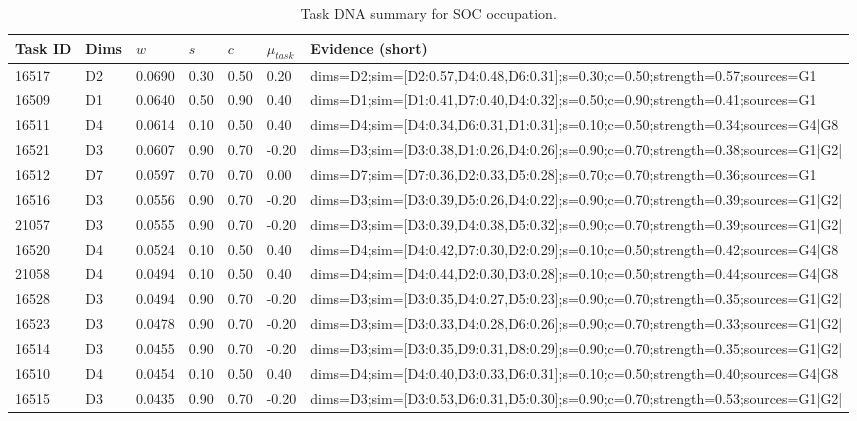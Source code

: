 \begin{table}[htbp]
\centering
\caption{Task DNA summary for SOC occupation.}
\label{tab:appendix_taskdna}
\begin{tabular}{@{}lllllll@{}}
\toprule
Task ID & Dims & $w$ & $s$ & $c$ & $\mu_{task}$ & Evidence (short) \\
\midrule
16517 & D2 & 0.0690 & 0.30 & 0.50 & 0.20 & dims=D2;sim=[D2:0.57,D4:0.48,D6:0.31];s=0.30;c=0.50;strength=0.57;sources=G1 \\
16509 & D1 & 0.0640 & 0.50 & 0.90 & 0.40 & dims=D1;sim=[D1:0.41,D7:0.40,D4:0.32];s=0.50;c=0.90;strength=0.41;sources=G1 \\
16511 & D4 & 0.0614 & 0.10 & 0.50 & 0.40 & dims=D4;sim=[D4:0.34,D6:0.31,D1:0.31];s=0.10;c=0.50;strength=0.34;sources=G4|G8 \\
16521 & D3 & 0.0607 & 0.90 & 0.70 & -0.20 & dims=D3;sim=[D3:0.38,D1:0.26,D4:0.26];s=0.90;c=0.70;strength=0.38;sources=G1|G2| \\
16512 & D7 & 0.0597 & 0.70 & 0.70 & 0.00 & dims=D7;sim=[D7:0.36,D2:0.33,D5:0.28];s=0.70;c=0.70;strength=0.36;sources=G1 \\
16516 & D3 & 0.0556 & 0.90 & 0.70 & -0.20 & dims=D3;sim=[D3:0.39,D5:0.26,D4:0.22];s=0.90;c=0.70;strength=0.39;sources=G1|G2| \\
21057 & D3 & 0.0555 & 0.90 & 0.70 & -0.20 & dims=D3;sim=[D3:0.39,D4:0.38,D5:0.32];s=0.90;c=0.70;strength=0.39;sources=G1|G2| \\
16520 & D4 & 0.0524 & 0.10 & 0.50 & 0.40 & dims=D4;sim=[D4:0.42,D7:0.30,D2:0.29];s=0.10;c=0.50;strength=0.42;sources=G4|G8 \\
21058 & D4 & 0.0494 & 0.10 & 0.50 & 0.40 & dims=D4;sim=[D4:0.44,D2:0.30,D3:0.28];s=0.10;c=0.50;strength=0.44;sources=G4|G8 \\
16528 & D3 & 0.0494 & 0.90 & 0.70 & -0.20 & dims=D3;sim=[D3:0.35,D4:0.27,D5:0.23];s=0.90;c=0.70;strength=0.35;sources=G1|G2| \\
16523 & D3 & 0.0478 & 0.90 & 0.70 & -0.20 & dims=D3;sim=[D3:0.33,D4:0.28,D6:0.26];s=0.90;c=0.70;strength=0.33;sources=G1|G2| \\
16514 & D3 & 0.0455 & 0.90 & 0.70 & -0.20 & dims=D3;sim=[D3:0.35,D9:0.31,D8:0.29];s=0.90;c=0.70;strength=0.35;sources=G1|G2| \\
16510 & D4 & 0.0454 & 0.10 & 0.50 & 0.40 & dims=D4;sim=[D4:0.40,D3:0.33,D6:0.31];s=0.10;c=0.50;strength=0.40;sources=G4|G8 \\
16515 & D3 & 0.0435 & 0.90 & 0.70 & -0.20 & dims=D3;sim=[D3:0.53,D6:0.31,D5:0.30];s=0.90;c=0.70;strength=0.53;sources=G1|G2| \\

\end{tabular}
\end{table}
